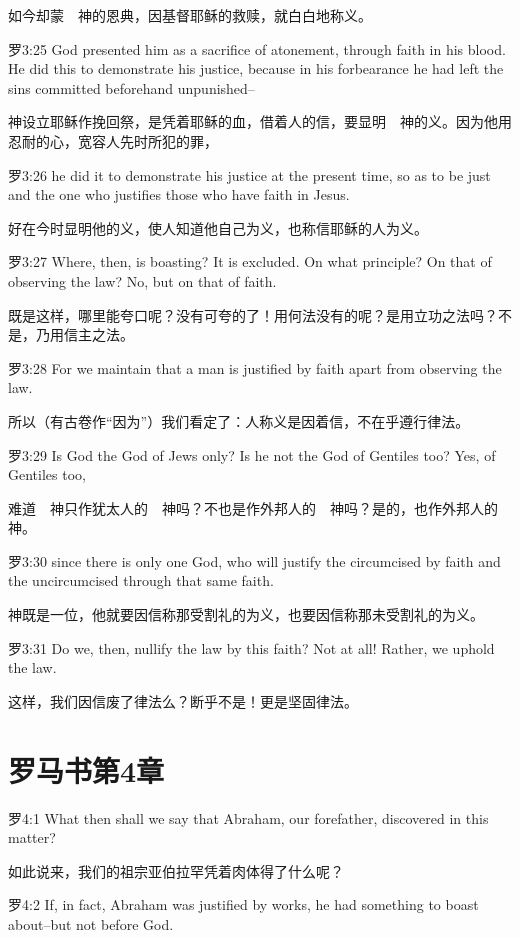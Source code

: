 \documentclass[a4paper,11pt,onecolumn,twoside]{ctexart}
\begin{document}
\begin{multicols}{2}
 如今却蒙　神的恩典，因基督耶稣的救赎，就白白地称义。


 罗3:25
 God presented him as a sacrifice of atonement, through faith in his blood. He did this to demonstrate his justice, because in his forbearance he had left the sins committed beforehand unpunished--

 神设立耶稣作挽回祭，是凭着耶稣的血，借着人的信，要显明　神的义。因为他用忍耐的心，宽容人先时所犯的罪，


 罗3:26
 he did it to demonstrate his justice at the present time, so as to be just and the one who justifies those who have faith in Jesus.

 好在今时显明他的义，使人知道他自己为义，也称信耶稣的人为义。


 罗3:27
 Where, then, is boasting? It is excluded. On what principle? On that of observing the law? No, but on that of faith.

 既是这样，哪里能夸口呢？没有可夸的了！用何法没有的呢？是用立功之法吗？不是，乃用信主之法。


 罗3:28
 For we maintain that a man is justified by faith apart from observing the law.

 所以（有古卷作“因为”）我们看定了：人称义是因着信，不在乎遵行律法。


 罗3:29
 Is God the God of Jews only? Is he not the God of Gentiles too? Yes, of Gentiles too,

 难道　神只作犹太人的　神吗？不也是作外邦人的　神吗？是的，也作外邦人的　神。


 罗3:30
 since there is only one God, who will justify the circumcised by faith and the uncircumcised through that same faith.

 神既是一位，他就要因信称那受割礼的为义，也要因信称那未受割礼的为义。


 罗3:31
 Do we, then, nullify the law by this faith? Not at all! Rather, we uphold the law.

 这样，我们因信废了律法么？断乎不是！更是坚固律法。


 \section{罗马书第4章}
 罗4:1
 What then shall we say that Abraham, our forefather, discovered in this matter?

 如此说来，我们的祖宗亚伯拉罕凭着肉体得了什么呢？


 罗4:2
 If, in fact, Abraham was justified by works, he had something to boast about--but not before God.


\end{multicols}
\end{document}
